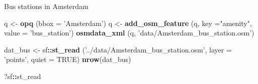 \documentclass[ignorenonframetext,]{beamer}
\newenvironment{Shaded}{\begin{snugshade}}{\end{snugshade}}
\newcommand{\KeywordTok}[1]{\textcolor[rgb]{0.13,0.29,0.53}{\textbf{#1}}}
\newcommand{\DataTypeTok}[1]{\textcolor[rgb]{0.13,0.29,0.53}{#1}}
\newcommand{\StringTok}[1]{\textcolor[rgb]{0.31,0.60,0.02}{#1}}
\newcommand{\OtherTok}[1]{\textcolor[rgb]{0.56,0.35,0.01}{#1}}
\newcommand{\OperatorTok}[1]{\textcolor[rgb]{0.81,0.36,0.00}{\textbf{#1}}}
\newcommand{\NormalTok}[1]{#1}
\begin{document}
\begin{frame}[fragile]{Bus stations in Amsterdam}

\begin{Shaded}
\begin{Highlighting}[]
\NormalTok{q <-}\StringTok{ }\KeywordTok{opq}\NormalTok{ (}\DataTypeTok{bbox =} \StringTok{'Amsterdam'}\NormalTok{)}
\NormalTok{q <-}\StringTok{ }\KeywordTok{add_osm_feature}\NormalTok{ (q, }\DataTypeTok{key =}\StringTok{"amenity"}\NormalTok{,}
                      \DataTypeTok{value =} \StringTok{'bus_station'}\NormalTok{) }
\KeywordTok{osmdata_xml}\NormalTok{ (q, }\StringTok{'data/Amsterdam_bus_station.osm'}\NormalTok{)}
\end{Highlighting}
\end{Shaded}

\begin{Shaded}
\begin{Highlighting}[]
\NormalTok{dat_bus <-}\StringTok{ }\NormalTok{sf}\OperatorTok{::}\KeywordTok{st_read}\NormalTok{ (}\StringTok{'../data/Amsterdam_bus_station.osm'}\NormalTok{, }
                        \DataTypeTok{layer =} \StringTok{'points'}\NormalTok{, }\DataTypeTok{quiet =} \OtherTok{TRUE}\NormalTok{)}
\KeywordTok{nrow}\NormalTok{(dat_bus)}
\end{Highlighting}
\end{Shaded}

\begin{Shaded}
\begin{Highlighting}[]
\NormalTok{?sf}\OperatorTok{::}\NormalTok{st_read}
\end{Highlighting}
\end{Shaded}

\end{frame}
\end{document}
